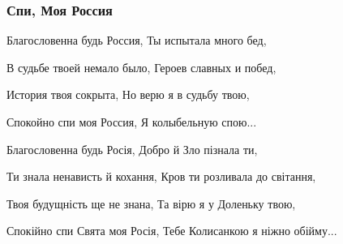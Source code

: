  
 
 

\subsubsection{Спи, Моя Россия}
\label{sec:poetry.rus.maria_zhukova.spi_moja_rossia}

Благословенна будь Россия,
Ты испытала много бед,

В судьбе твоей немало было,
Героев славных и побед,

История твоя сокрыта,
Но верю я в судьбу твою,

Спокойно спи моя Россия,
Я колыбельную спою...

Благословенна будь Росія,
Добро й Зло пізнала ти,

Ти знала ненависть й кохання,
Кров ти розливала до світання,

Твоя будущність ще не знана,
Та вірю я у Доленьку твою,

Спокійно спи Свята моя Росія,
Тебе Колисанкою я ніжно обійму...

